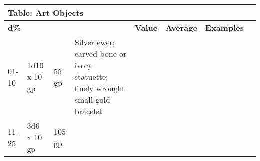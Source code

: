 \vspace{12pt}
\begin{longtable}{llllllll}
\hline
\multicolumn{4}{|p{4.327in}|}{\begin{minipage}[t]{4.327in}\raggedright
\textbf{Table: Art Objects}\end{minipage}}\\
\hline
\multicolumn{4}{p{0.173in}|}{\begin{minipage}[t]{0.173in}\raggedright
\textbf{d\%}\end{minipage}} & \multicolumn{1}{|p{0.349in}|}{\begin{minipage}[t]{0.349in}\raggedright
\textbf{Value}\end{minipage}} & \multicolumn{1}{p{0.661in}|}{\begin{minipage}[t]{0.661in}\raggedright
\textbf{Average}\end{minipage}} & \multicolumn{1}{p{0.450in}|}{\begin{minipage}[t]{0.450in}\raggedright
\textbf{Examples}\end{minipage}}\\
\hline
\multicolumn{1}{p{2.868in}|}{\begin{minipage}[t]{2.868in}\raggedright
01-10\end{minipage}} & \multicolumn{1}{p{0.043in}|}{\begin{minipage}[t]{0.043in}\raggedright
1d10 x 10 gp\end{minipage}} & \multicolumn{1}{p{0.043in}|}{\begin{minipage}[t]{0.043in}\raggedright
55 gp\end{minipage}} & \multicolumn{1}{p{0.043in}|}{\begin{minipage}[t]{0.043in}\raggedright
Silver ewer; carved bone or ivory statuette; finely wrought small gold bracelet\end{minipage}}\\
\hline
\multicolumn{1}{p{0.043in}|}{\begin{minipage}[t]{0.043in}\raggedright
11-25\end{minipage}} & \multicolumn{1}{|p{0.349in}|}{\begin{minipage}[t]{0.349in}\raggedright
3d6 x 10 gp\end{minipage}} & \multicolumn{1}{p{0.661in}|}{\begin{minipage}[t]{0.661in}\raggedright
105 gp\end{minipage}} & \multicolumn{1}{p{0.450in}|}{\begin{minipage}[t]{0.450in}\raggedright

\end{minipage}}
\end{longtable}
